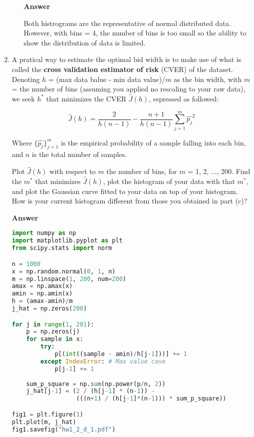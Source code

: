 \documentclass[11pt]{article}
\begin{document}
\begin{enumerate}[label=(\alph*)]
\begin{enumerate}[label=(\roman*)]
\noindent\textbf{Answer}

Both histrograms are the representative of normal distributed data. However, with bins = 4, the number of bins is too small so the ability to show the distribution of data is limited.

\end{enumerate}

\item A pratical way to estimate the optimal bid width is to make use of what is called the \textbf{cross validation estimator of risk} (CVER) of the dataset. Denoting $h$ = (max data balue - min data value)/$m$ as the bin width, with $m$ = the number of bins (assuming you applied no rescaling to your raw data), 
we seek $h^*$ that minimizes the CVER $\hat{J}(h)$, espressed as followed: 

\begin{equation}
\hat{J}(h) = \frac{2}{h(n-1)}-\frac{n+1}{h(n-1)}\sum_{j=1}^m \hat{p_j}^2
\end{equation}

Where $\{ \hat{p_j} \}_{j=1}^m$ is the empirical probability of a sample falling into each bin, and $n$ is the total number of samples. 

Plot $\hat{J}(h)$ with respect to $m$ the number of bins, for $m$ = 1, 2, ..., 200. Find the $m^*$ that minimizes $\hat{J}(h)$, plot the histogram of your data with that $m^*$, and plot the Gaussian curve fitted to your data on top of your histogram. How is your current histogram different from those you obtained in part (c)?

\noindent\textbf{Answer}

\begin{lstlisting}[language=Python, showstringspaces=false]
import numpy as np
import matplotlib.pyplot as plt
from scipy.stats import norm

n = 1000
x = np.random.normal(0, 1, n)
m = np.linspace(1, 200, num=200)
amax = np.amax(x)
amin = np.amin(x)
h = (amax-amin)/m
j_hat = np.zeros(200)

for j in range(1, 201):
    p = np.zeros(j)
    for sample in x:
        try:
            p[(int((sample - amin)/h[j-1]))] += 1
        except IndexError: # Max value case
            p[j-1] += 1
            
    sum_p_square = np.sum(np.power(p/n, 2))
    j_hat[j-1] = (2 / (h[j-1] * (n-1)) - 
                  (((n+1) / (h[j-1]*(n-1))) * sum_p_square))

fig1 = plt.figure(1)
plt.plot(m, j_hat)
fig1.savefig("hw1_2_d_1.pdf")


\end{lstlisting}
\end{enumerate}
\end{document}
